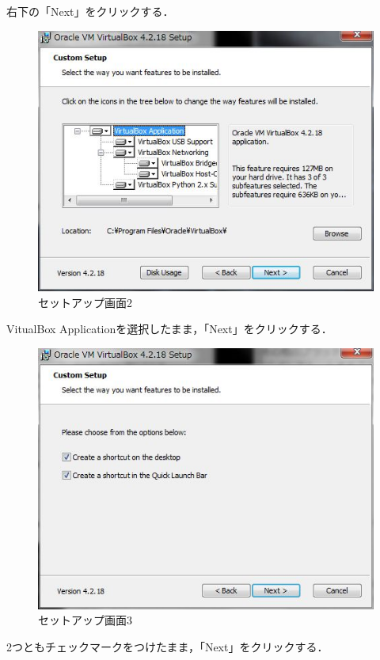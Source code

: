 右下の「Next」をクリックする．


\begin{figure}[H]
\centering
\includegraphics[width=13cm]{VBsetup2.jpg}
\caption{セットアップ画面2}\label{サンプル図}
\end{figure}

VitualBox Applicationを選択したまま，「Next」をクリックする．


\begin{figure}[H]
\centering
\includegraphics[width=13cm]{VBsetup3.jpg}
\caption{セットアップ画面3}\label{サンプル図}
\end{figure}

2つともチェックマークをつけたまま，「Next」をクリックする．



